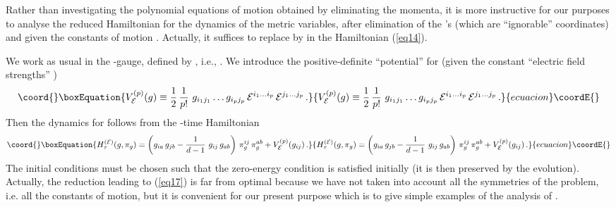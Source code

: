 \documentclass[a4paper,12pt]{article}
\begin{document}
Rather than investigating the polynomial
equations of motion obtained by eliminating the momenta,
it is more instructive for our purposes to
analyse 
the reduced Hamiltonian for the dynamics of the metric
variables, after 
elimination of the \coordHE{}'s (which are ``ignorable'' coordinates)
and given the constants of motion \coordHE{}. 
Actually, it suffices to replace \coordHE{} by \coordHE{} in the Hamiltonian (\ref{eq14}). 


We work as usual in the \myHighlight{$\tau$}\coordHE{}-gauge, defined by \coordHE{},
i.e., \coordHE{}. We introduce the 
positive-definite ``potential'' for \coordHE{} (given the constant 
``electric field strengths'' \coordHE{})
\begin{equation}\coord{}\boxEquation{
V_{\cal E}^{(p)} (g) \equiv \frac{1}{2} \, \frac{1}{p!} \ g_{i_1 j_1} 
\ldots g_{i_p j_p} \, {\cal E}^{i_1 \ldots i_p} \, {\cal E}^{j_1 \ldots 
j_p} \, . \label{eq15}
}{
V_{\cal E}^{(p)} (g) \equiv \frac{1}{2} \, \frac{1}{p!} \ g_{i_1 j_1} 
\ldots g_{i_p j_p} \, {\cal E}^{i_1 \ldots i_p} \, {\cal E}^{j_1 \ldots 
j_p} \, . }{ecuacion}\coordE{}\end{equation}
Then the dynamics for \coordHE{} follows from the \myHighlight{$\tau$}\coordHE{}-time 
Hamiltonian
\begin{equation}\coord{}\boxEquation{
H_{\tau}^{({\cal E})} (g, \pi_g) = \left( g_{ia} \, g_{jb} - 
\frac{1}{d-1} \ g_{ij} \, g_{ab} \right) \, \pi_g^{ij} \, \pi_g^{ab} + 
V_{\cal E}^{(p)} (g_{ij}) \, . \label{eq17}
}{
H_{\tau}^{({\cal E})} (g, \pi_g) = \left( g_{ia} \, g_{jb} - 
\frac{1}{d-1} \ g_{ij} \, g_{ab} \right) \, \pi_g^{ij} \, \pi_g^{ab} + 
V_{\cal E}^{(p)} (g_{ij}) \, . }{ecuacion}\coordE{}\end{equation}
The initial conditions must be chosen such that the zero-energy 
condition \coordHE{} is satisfied initially (it is 
then preserved by the evolution). Actually, the reduction leading to 
(\ref{eq17}) is far from optimal because we have not 
taken into account all the symmetries of the problem, i.e. all the 
constants of motion, but it is convenient for our present purpose which 
is to give simple examples of the analysis of \cite{dh1}. 
\end{document}
